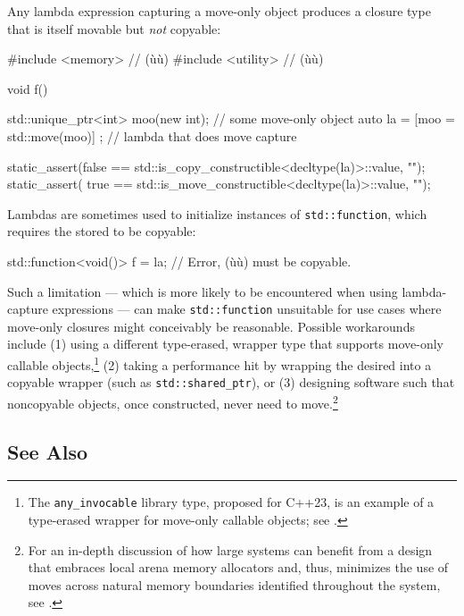 Any lambda expression capturing a move-only object produces a closure
type that is itself movable but \emph{not} copyable:

\begin{emcppshiddenlisting}[emcppsbatch=e4,emcppsstandards={c++14}]
#include <memory>   // (ù{}ù)
#include <utility>  // (ù{}ù)
\end{emcppshiddenlisting}
\begin{emcppslisting}[emcppsbatch=e4]
void f()
{
    std::unique_ptr<int> moo(new int);    // some move-only object
    auto la = [moo = std::move(moo)]{ };  // lambda that does move capture

    static_assert(false == std::is_copy_constructible<decltype(la)>::value, "");
    static_assert( true == std::is_move_constructible<decltype(la)>::value, "");
}
\end{emcppslisting}
    
\noindent Lambdas are sometimes used to initialize instances of
\lstinline!std::function!, which requires the stored  to be copyable:

\begin{emcppslisting}
std::function<void()> f = la;  // Error, (ù{}ù) must be copyable.
\end{emcppslisting}
    
\noindent Such a limitation --- which is more likely to be encountered when using
lambda-capture expressions --- can make \lstinline!std::function!
unsuitable for use cases where move-only closures might conceivably be
reasonable. Possible workarounds include (1) using a different
type-erased,  wrapper type that supports
move-only callable objects,{\cprotect\footnote{The
\lstinline!any_invocable! library type, proposed for C++23, is an
example of a type-erased wrapper for move-only callable objects; see
  \cite{calabrese20}.}} (2) taking a performance hit by wrapping the
desired  into a copyable wrapper (such as
\lstinline!std::shared_ptr!), or (3) designing software such that
noncopyable objects, once constructed, never need to
move.\footnote{For an in-depth discussion of how large systems can
benefit from a design that embraces local arena memory allocators and,
thus, minimizes the use of moves across natural memory boundaries
identified throughout the system, see \cite{lakos22}.}

\subsection[See Also]{See Also}\label{see-also}


